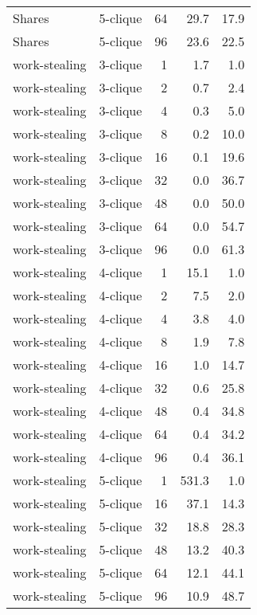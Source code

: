\begin{longtable}{llr|rr}
        Shares &  5-clique &           64 &   29.7 &     17.9 \\
        Shares &  5-clique &           96 &   23.6 &     22.5 \\
 work-stealing &  3-clique &            1 &    1.7 &      1.0 \\
 work-stealing &  3-clique &            2 &    0.7 &      2.4 \\
 work-stealing &  3-clique &            4 &    0.3 &      5.0 \\
 work-stealing &  3-clique &            8 &    0.2 &     10.0 \\
 work-stealing &  3-clique &           16 &    0.1 &     19.6 \\
 work-stealing &  3-clique &           32 &    0.0 &     36.7 \\
 work-stealing &  3-clique &           48 &    0.0 &     50.0 \\
 work-stealing &  3-clique &           64 &    0.0 &     54.7 \\
 work-stealing &  3-clique &           96 &    0.0 &     61.3 \\
 work-stealing &  4-clique &            1 &   15.1 &      1.0 \\
 work-stealing &  4-clique &            2 &    7.5 &      2.0 \\
 work-stealing &  4-clique &            4 &    3.8 &      4.0 \\
 work-stealing &  4-clique &            8 &    1.9 &      7.8 \\
 work-stealing &  4-clique &           16 &    1.0 &     14.7 \\
 work-stealing &  4-clique &           32 &    0.6 &     25.8 \\
 work-stealing &  4-clique &           48 &    0.4 &     34.8 \\
 work-stealing &  4-clique &           64 &    0.4 &     34.2 \\
 work-stealing &  4-clique &           96 &    0.4 &     36.1 \\
 work-stealing &  5-clique &            1 &  531.3 &      1.0 \\
 work-stealing &  5-clique &           16 &   37.1 &     14.3 \\
 work-stealing &  5-clique &           32 &   18.8 &     28.3 \\
 work-stealing &  5-clique &           48 &   13.2 &     40.3 \\
 work-stealing &  5-clique &           64 &   12.1 &     44.1 \\
 work-stealing &  5-clique &           96 &   10.9 &     48.7 \\
\end{longtable}
